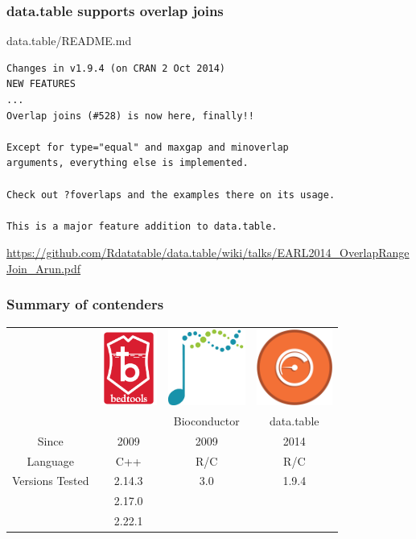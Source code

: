 \documentclass{beamer}
\begin{document}
  

\begin{frame}[fragile]
  \frametitle{data.table supports overlap joins}

data.table/README.md

\begin{verbatim}
Changes in v1.9.4 (on CRAN 2 Oct 2014)
NEW FEATURES
...
Overlap joins (#528) is now here, finally!! 

Except for type="equal" and maxgap and minoverlap 
arguments, everything else is implemented. 

Check out ?foverlaps and the examples there on its usage. 

This is a major feature addition to data.table.
\end{verbatim}

\alert{\url{https://github.com/Rdatatable/data.table/wiki/talks/EARL2014_OverlapRangeJoin_Arun.pdf}}

\end{frame}

\begin{frame}
  \frametitle{Summary of contenders}
  
  \begin{tabular}{cccc}
    &
    \includegraphics[height=2.5cm]{bedtools} &
    \includegraphics[height=2.5cm]{bioconductor} &
    \includegraphics[height=2.5cm]{datatable} \\
    &  & Bioconductor & data.table \\
    \hline
    Since & 2009 & 2009 & 2014 \\
    Language & C++ & R/C & R/C \\
    Versions Tested & 2.14.3 & 3.0 & 1.9.4 \\
     & 2.17.0 \\
    & 2.22.1
  \end{tabular}
\end{frame}
\end{document}
